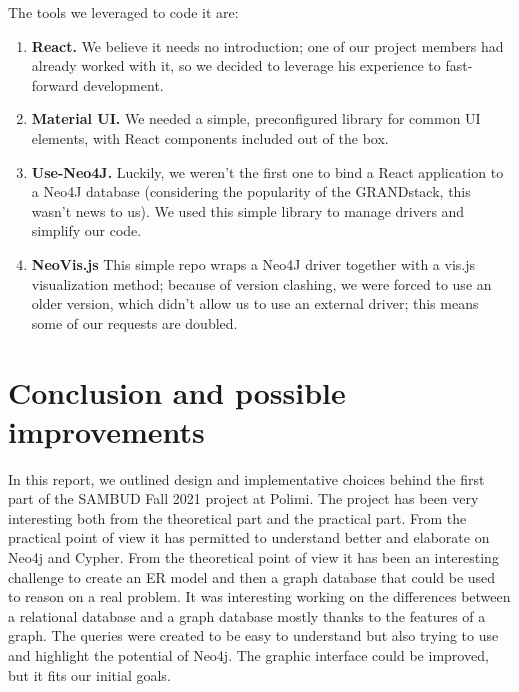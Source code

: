 \documentclass[table, 12pt]{article}
\begin{document}
The tools we leveraged to code it are:
\begin{enumerate}
    \item \textbf{React.} We believe it needs no introduction; one of our project members had already worked with it, so we decided to leverage his experience to fast-forward development.
    \item \textbf{Material UI.} We needed a simple, preconfigured library for common UI elements, with React components included out of the box.
    \item \textbf{Use-Neo4J.} Luckily, we weren't the first one to bind a React application to a Neo4J database (considering the popularity of the GRANDstack, this wasn't news to us). We used this simple library to manage drivers and simplify our code.
    \item \textbf{NeoVis.js} This simple repo wraps a Neo4J driver together with a vis.js visualization method; because of version clashing, we were forced to use an older version, which didn't allow us to use an external driver; this means some of our requests are doubled.
\end{enumerate}




\section{Conclusion and possible improvements}
In this report, we outlined design and implementative choices behind the first part of the SAMBUD Fall 2021 project at Polimi.
The project has been very interesting both from the theoretical part and the practical part. From the practical point of view it has permitted to understand better and elaborate on Neo4j and Cypher. From the theoretical point of view it has been an interesting challenge to create an ER model and then a graph database that could be used to reason on a real problem. It was interesting working on the differences between a relational database and a graph database mostly thanks to the features of a graph. The queries were created to be easy to understand but also trying to use and highlight the potential of Neo4j. The graphic interface could be improved, but it fits our initial goals.
\end{document}
